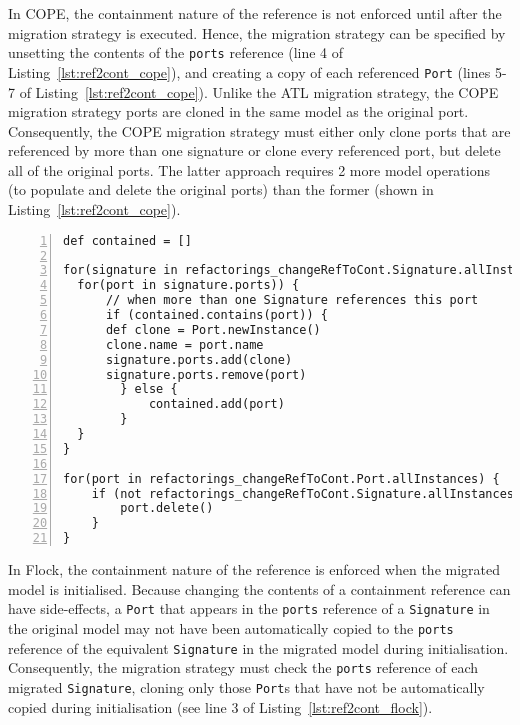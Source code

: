In COPE, the containment nature of the reference is not enforced until after the migration strategy is executed. Hence, the migration strategy can be specified by unsetting the contents of the \texttt{ports} reference (line 4 of Listing~\ref{lst:ref2cont_cope}), and creating a copy of each referenced \texttt{Port} (lines 5-7 of Listing~\ref{lst:ref2cont_cope}). Unlike the ATL migration strategy, the COPE migration strategy ports are cloned in the same model as the original port. Consequently, the COPE migration strategy must either only clone ports that are referenced by more than one signature or clone every referenced port, but delete all of the original ports. The latter approach requires 2 more model operations (to populate and delete the original ports) than the former (shown in Listing~\ref{lst:ref2cont_cope}).

\begin{lstlisting}[basicstyle=\ttfamily\footnotesize, flexiblecolumns=true, numbers=left, nolol=true, caption=Change R to C model migration in COPE, label=lst:ref2cont_cope, language=COPE, tabsize=2]
def contained = []

for(signature in refactorings_changeRefToCont.Signature.allInstances) {
  for(port in signature.ports)) {
	  // when more than one Signature references this port
	  if (contained.contains(port)) {
      def clone = Port.newInstance()
      clone.name = port.name
      signature.ports.add(clone)
      signature.ports.remove(port)
		} else {
			contained.add(port)
		}
  }
}

for(port in refactorings_changeRefToCont.Port.allInstances) {
	if (not refactorings_changeRefToCont.Signature.allInstances.any { it.ports.contains(port) }) {
	  	port.delete()
	}
}
\end{lstlisting}

In Flock, the containment nature of the reference is enforced when the migrated model is initialised. Because changing the contents of a containment reference can have side-effects, a \texttt{Port} that appears in the \texttt{ports} reference of a \texttt{Signature} in the original model may not have been automatically copied to the \texttt{ports} reference of the equivalent \texttt{Signature} in the migrated model during initialisation. Consequently, the migration strategy must check the \texttt{ports} reference of each migrated \texttt{Signature}, cloning only those \texttt{Port}s that have not be automatically copied during initialisation (see line 3 of Listing~\ref{lst:ref2cont_flock}).

